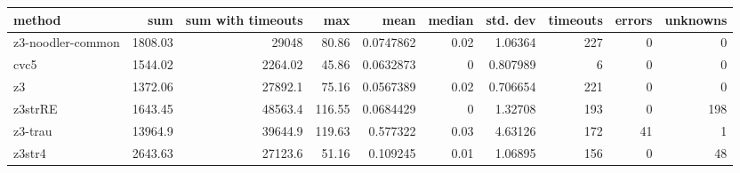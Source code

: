\begin{tabular}{lrrrrrrrrr}
\hline
 method            &      sum &   sum with timeouts &    max &      mean &   median &   std. dev &   timeouts &   errors &   unknowns \\
\hline
 z3-noodler-common &  1808.03 &            29048    &  80.86 & 0.0747862 &     0.02 &   1.06364  &        227 &        0 &          0 \\
 cvc5              &  1544.02 &             2264.02 &  45.86 & 0.0632873 &     0    &   0.807989 &          6 &        0 &          0 \\
 z3                &  1372.06 &            27892.1  &  75.16 & 0.0567389 &     0.02 &   0.706654 &        221 &        0 &          0 \\
 z3strRE           &  1643.45 &            48563.4  & 116.55 & 0.0684429 &     0    &   1.32708  &        193 &        0 &        198 \\
 z3-trau           & 13964.9  &            39644.9  & 119.63 & 0.577322  &     0.03 &   4.63126  &        172 &       41 &          1 \\
 z3str4            &  2643.63 &            27123.6  &  51.16 & 0.109245  &     0.01 &   1.06895  &        156 &        0 &         48 \\
\hline
\end{tabular}
